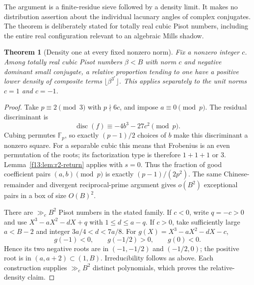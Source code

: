 \documentclass[11pt,a4paper]{article}
\newtheorem{theorem}{Theorem}[section]
\theoremstyle{definition}
\theoremstyle{remark}
\numberwithin{equation}{section}
\begin{document}
The argument is a finite-residue sieve followed by a density limit.
It makes no distribution assertion about the individual lacunary
angles of complex conjugates. The theorem is deliberately stated
for totally real cubic Pisot numbers, including the entire real
configuration relevant to an algebraic Mills shadow.

\begin{theorem}[Density one at every fixed nonzero norm]
\label{f13:thm:r2-fixednorm}
Fix a nonzero integer $c$. Among totally real cubic Pisot numbers
$\beta<B$ with norm $c$ and negative dominant small conjugate, a
relative proportion tending to one have a positive lower density
of composite terms $\lfloor\beta^{3^r}\rfloor$.
This applies separately to the unit norms $c=1$ and $c=-1$.
\end{theorem}
\begin{proof}
Take $p\equiv2\pmod3$ with $p\nmid6c$, and impose $a\equiv0\pmod p$.
The residual discriminant is
\[
 \operatorname{disc}(f)\equiv-4b^3-27c^2\pmod p.
\]
Cubing permutes $\mathbb F_p$, so exactly $(p-1)/2$ choices of $b$
make this discriminant a nonzero square. For a separable cubic this
means that Frobenius is an even permutation of the roots; its
factorization type is therefore $1+1+1$ or $3$.
Lemma~\ref{f13:lem:r2-return} applies with $s=0$.
Thus the fraction of good coefficient pairs $(a,b)\pmod p$ is
exactly $(p-1)/(2p^2)$. The same Chinese-remainder and divergent
reciprocal-prime argument gives $o(B^2)$ exceptional pairs in a
box of size $O(B)^2$.

There are $\gg_c B^2$ Pisot numbers in the stated family.
If $c<0$, write $q=-c>0$ and use
$X^3-aX^2-dX+q$ with $1\le d\le a-q$.
If $c>0$, take sufficiently large $a<B-2$ and integer
$3a/4<d<7a/8$. For
$g(X)=X^3-aX^2-dX-c$,
\[
 g(-1)<0,\qquad g(-1/2)>0,\qquad g(0)<0.
\]
Hence its two negative roots are in $(-1,-1/2)$ and $(-1/2,0)$;
the positive root is in $(a,a+2)\subset(1,B)$.
Irreducibility follows as above. Each construction supplies
$\gg_c B^2$ distinct polynomials, which proves the relative-density
claim.
\end{proof}
\end{document}
